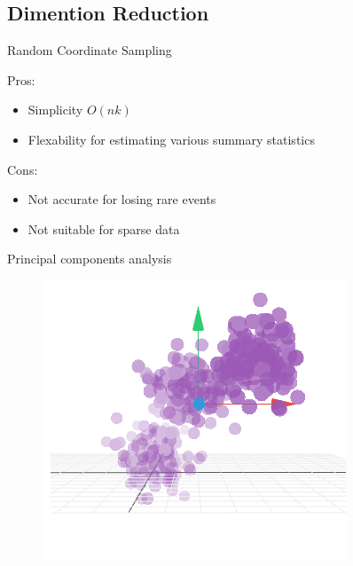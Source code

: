 \documentclass[ignorenonframetext,]{beamer}
\providecommand{\tightlist}{%
  \setlength{\itemsep}{0pt}\setlength{\parskip}{0pt}}
\begin{document}
\subsection{Dimention Reduction}\label{dimention-reduction}

\begin{frame}{Random Coordinate Sampling}

Pros:

\begin{itemize}
\tightlist
\item
  Simplicity \(O(nk)\)
\item
  Flexability for estimating various summary statistics
\end{itemize}

Cons:

\begin{itemize}
\tightlist
\item
  Not accurate for losing rare events
\item
  Not suitable for sparse data
\end{itemize}

\end{frame}

\begin{frame}{Principal components analysis}

\begin{figure}
\centering
\includegraphics{pics/09-1.png}
\caption{}
\end{figure}

\end{frame}
\end{document}
